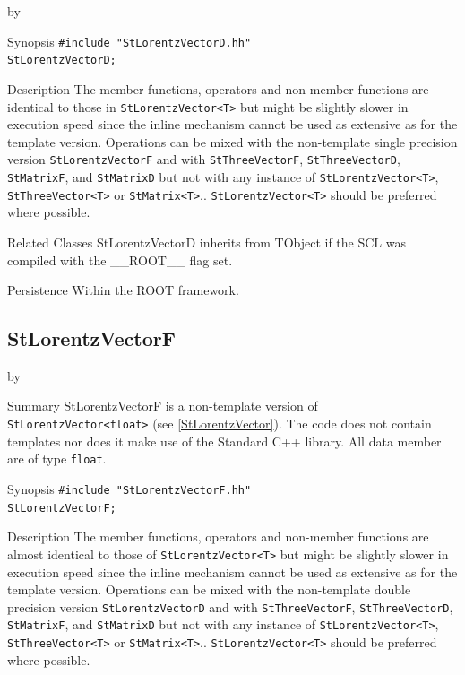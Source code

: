 \documentclass[twoside]{article}
\newcommand{\name}[1]{\textsf{#1}}%
\newcommand{\entrylabel}[1]{\mbox{\textbf{{#1}}}\hfil}%
\newenvironment{entry}
{\begin{list}{}%
    {\renewcommand{\makelabel}{\entrylabel}%
     \setlength{\labelwidth}{90pt}%
     \setlength{\leftmargin}{\labelwidth}
     \advance\leftmargin by \labelsep%
      }%
    }%
  {\end{list}}
\newcommand{\Entrylabel}[1]%
{\raisebox{0pt}[1ex][0pt]{\makebox[\labelwidth][l]%
    {\parbox[t]{\labelwidth}{\hspace{0pt}\textbf{{#1}}}}}}
\newenvironment{Entry}%
{\renewcommand{\entrylabel}{\Entrylabel}\begin{entry}}%
  {\end{entry}}
\begin{document}
\begin{description}
\begin{Entry}
\item[Synopsis]
    \verb+#include "StLorentzVectorD.hh"+ \\
    \verb+StLorentzVectorD;+
    
    
\item[Description]       
    The member functions, operators and non-member functions are identical
    to those in \verb+StLorentzVector<T>+ but might be slightly slower in execution speed
    since the inline mechanism cannot be used as extensive as for the template
    version. Operations can be mixed with the non-template single precision version
    \texttt{StLorentzVectorF} and with \texttt{StThreeVectorF}, \texttt{StThreeVectorD},
    \texttt{StMatrixF}, and \texttt{StMatrixD}
    but not with any instance of \verb+StLorentzVector<T>+, \verb+StThreeVector<T>+ or
    \verb+StMatrix<T>+..
    \verb+StLorentzVector<T>+ should be preferred where possible.

\item[Related Classes]
    StLorentzVectorD inherits from TObject 
    if the SCL was compiled with the \name{\_\_ROOT\_\_} flag set.
    
\item[Persistence]
    Within the ROOT framework.

\end{Entry}

%
%
\subsection{StLorentzVectorF } \label{StLorentzVectorF}
\begin{Entry}
\item[Summary]
    StLorentzVectorF is a non-template version of \verb+StLorentzVector<float>+
    (see \ref{StLorentzVector}). The code does not contain templates nor
    does it make use of the Standard C++ library. All data member are of
    type \texttt{float}.
    
\item[Synopsis]
    \verb+#include "StLorentzVectorF.hh"+ \\
    \verb+StLorentzVectorF;+
    
    
\item[Description]       
    The member functions, operators and non-member functions are almost identical
    to those of \verb+StLorentzVector<T>+ but might be slightly slower in execution speed
    since the inline mechanism cannot be used as extensive as for the template
    version. Operations can be mixed with the non-template double precision version
    \texttt{StLorentzVectorD} and with \texttt{StThreeVectorF}, \texttt{StThreeVectorD},
    \texttt{StMatrixF}, and \texttt{StMatrixD}
    but not with any instance of \verb+StLorentzVector<T>+, \verb+StThreeVector<T>+ or
    \verb+StMatrix<T>+..
    \verb+StLorentzVector<T>+ should be preferred where possible.


\end{Entry}
\end{description}
\end{document}
